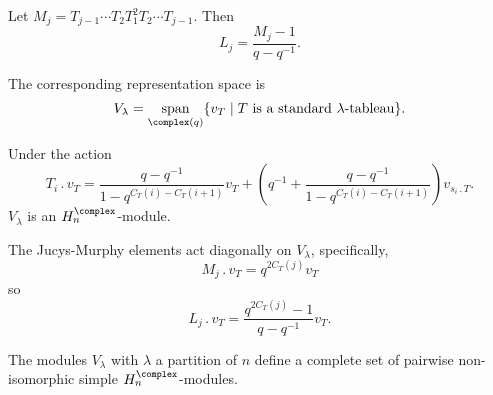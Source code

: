 \documentclass[fleqn]{NotesClass}
\newcommand{\action}{\mathbin{.}}
\DeclareMathOperator{\Span}{span}
\begin{document}
    \begin{lma}{}{}
        Let \(M_j = T_{j-1} \dotsm T_2 T_1^2 T_2 \dotsm T_{j-1}\).
        Then
        \begin{equation}
            L_j = \frac{M_j - 1}{q - q^{-1}}.
        \end{equation}
    \end{lma}
    
    The corresponding representation space is
    \begin{equation}
        V_\lambda = \Span_{\complex(q)} \{v_T \mid T \text{ is a standard \(\lambda\)-tableau}\}.
    \end{equation}
    
    \begin{thm}{}{}
        Under the action
        \begin{equation}
            T_i \action v_T = \frac{q - q^{-1}}{1 - q^{C_T(i) - C_T(i + 1)}} v_T + \left( q^{-1} + \frac{q - q^{-1}}{1 - q^{C_T(i) - C_T(i + 1)}} \right) v_{s_i \action T}.
        \end{equation}
        \(V_\lambda\) is an \(H_n^{\complex}\)-module.
    \end{thm}
    
    \begin{lma}{}{}
        The Jucys-Murphy elements act diagonally on \(V_\lambda\), specifically,
        \begin{equation}
            M_j \action v_T = q^{2C_T(j)} v_T
        \end{equation}
        so
        \begin{equation}
            L_j \action v_T = \frac{q^{2C_T(j)} - 1}{q - q^{-1}}v_T.
        \end{equation}
    \end{lma}
    
    \begin{thm}{}{}
        The modules \(V_\lambda\) with \(\lambda\) a partition of \(n\) define a complete set of pairwise non-isomorphic simple \(H_n^{\complex}\)-modules.
    \end{thm}
    
\end{document}
